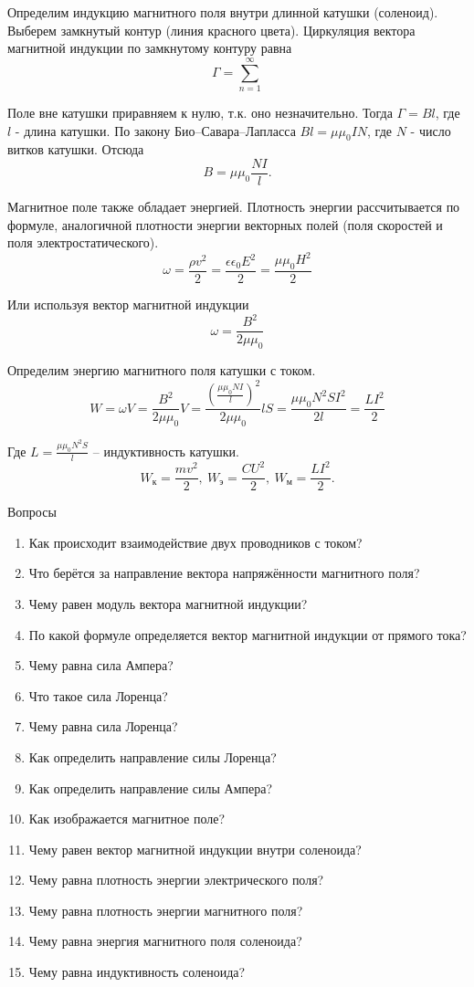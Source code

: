 \documentclass[a6paper, 11pt]{diss_4}
\renewcommand{\'}{\,'}
\begin{document}
Определим индукцию магнитного поля внутри длинной катушки (соленоид). Выберем замкнутый контур (линия красного цвета). Циркуляция вектора магнитной индукции по замкнутому контуру равна
\[
\Gamma=\sum\limits_{n=1}^{\infty}
\]

Поле вне катушки приравняем к нулю, т.к. оно незначительно. Тогда $\Gamma=Bl$, где $l$ - длина катушки. По закону Био--Савара--Лапласса  $Bl=\mu\mu_0IN$, где $N$ - число витков катушки. Отсюда
\[
B=\mu\mu_0\frac{NI}{l}.
\]

Магнитное поле также обладает энергией. Плотность энергии рассчитывается по формуле, аналогичной плотности энергии векторных полей (поля скоростей и поля электростатического).
\[
\omega=\frac{\rho v^2}{2}=\frac{\epsilon\epsilon_0E^2}{2}=\frac{\mu\mu_0H^2}{2}
\]

Или используя вектор магнитной индукции
\[
\omega=\frac{B^2}{2\mu\mu_0}
\]

Определим энергию магнитного поля катушки с током.
\[
W=\omega V=\frac{B^2}{2\mu\mu_0}V=\frac{(\frac{\mu\mu_0NI}{l})^2}{2\mu\mu_0}lS=
\frac{\mu\mu_0N^2SI^2}{2l}=\frac{LI^2}{2}
\]

Где $L=\frac{\mu\mu_0N^2S}{l} $ -- индуктивность катушки.
\[
W_к=\frac{mv^2}{2},\
W_э=\frac{CU^2}{2},\
W_м=\frac{LI^2}{2}.
\]

\begin{center}
   Вопросы
\end{center}
\begin{enumerate}
\item Как происходит взаимодействие двух проводников с током?
\item Что берётся за направление вектора напряжённости магнитного поля?
\item Чему равен модуль вектора магнитной индукции?
\item По какой формуле определяется вектор магнитной индукции от прямого тока?
\item Чему равна сила Ампера?
\item Что такое сила Лоренца?
\item Чему равна сила Лоренца?
\item Как определить направление силы Лоренца?
\item Как определить направление силы Ампера?
\item Как изображается магнитное поле?
\item Чему равен вектор магнитной индукции внутри соленоида?
\item Чему равна плотность энергии электрического поля?
\item Чему равна плотность энергии магнитного поля?
\item Чему равна энергия магнитного поля соленоида?
\item Чему равна индуктивность соленоида?
\end{enumerate}
\end{document}
